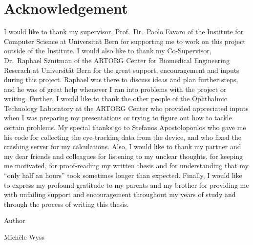 \section*{Acknowledgement}
I would like to thank my supervisor, Prof.\ Dr.\ Paolo Favaro of the Institute for Computer Science at Universit\"at Bern for supporting me to work on this project outside of the Institute. I would also like to thank my Co-Supervisor, Dr.\ Raphael Sznitman of the ARTORG Center for Biomedical Engineering Reserach at Universit\"at Bern for the great support, encouragement and inputs during this project. Raphael was there to discuss ideas and plan further steps, and he was of great help whenever I ran into problems with the project or writing. Further, I would like to thank the other people of the Ophthalmic Technology Laboratory at the ARTORG Center who provided appreciated inputs when I was preparing my presentations or trying to figure out how to tackle certain problems. My special thanks go to Stefanos Apostolopoulos who gave me his code for collecting the eye-tracking data from the device, and who fixed the crashing server for my calculations. Also, I would like to thank my partner and my dear friends and colleagues for listening to my unclear thoughts, for keeping me motivated, for proof-reading my written thesis and for understanding that my ``only half an hours'' took sometimes longer than expected. Finally, I would like to express my profound gratitude to my parents and my brother for providing me with unfailing support and encouragement throughout my years of study and through the process of writing this thesis.

\vspace{1cm}
\noindent Author

\vspace{1cm}
\noindent Mich\`ele Wyss